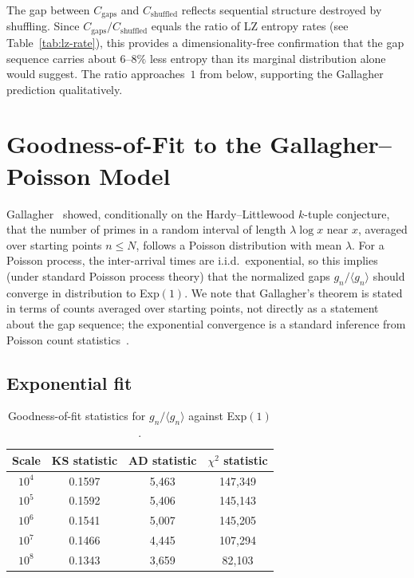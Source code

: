 \documentclass[11pt, a4paper]{amsart}
\theoremstyle{plain}
\theoremstyle{definition}
\begin{document}
The gap between $C_{\text{gaps}}$ and $C_{\text{shuffled}}$ reflects sequential structure destroyed by shuffling. Since $C_{\text{gaps}} / C_{\text{shuffled}}$ equals the ratio of LZ entropy rates (see Table~\ref{tab:lz-rate}), this provides a dimensionality-free confirmation that the gap sequence carries about $6$--$8\%$ less entropy than its marginal distribution alone would suggest.
The ratio approaches~$1$ from below, supporting the Gallagher prediction qualitatively.


\section{Goodness-of-Fit to the Gallagher--Poisson Model}
\label{sec:gof}

Gallagher~\cite{Gallagher1976} showed, conditionally on the Hardy--Littlewood $k$-tuple conjecture, that the number of primes in a random interval of length $\lambda \log x$ near $x$, averaged over starting points $n \le N$, follows a Poisson distribution with mean $\lambda$.
For a Poisson process, the inter-arrival times are i.i.d.\ exponential, so this implies (under standard Poisson process theory) that the normalized gaps $g_n / \langle g_n \rangle$ should converge in distribution to Exp$(1)$.
We note that Gallagher's theorem is stated in terms of counts averaged over starting points, not directly as a statement about the gap sequence; the exponential convergence is a standard inference from Poisson count statistics~\cite{Cohen2024}.

\subsection{Exponential fit}

\begin{table}[ht]
\centering
\caption{Goodness-of-fit statistics for $g_n / \langle g_n \rangle$ against Exp$(1)$.}
\label{tab:exp-fit}
\begin{tabular}{cccc}
\toprule
Scale & KS statistic & AD statistic & $\chi^2$ statistic \\
\midrule
$10^4$ & 0.1597 & 5{,}463 & 147{,}349 \\
$10^5$ & 0.1592 & 5{,}406 & 145{,}143 \\
$10^6$ & 0.1541 & 5{,}007 & 145{,}205 \\
$10^7$ & 0.1466 & 4{,}445 & 107{,}294 \\
$10^8$ & 0.1343 & 3{,}659 & 82{,}103 \\
\bottomrule
\end{tabular}
\end{table}
\end{document}
